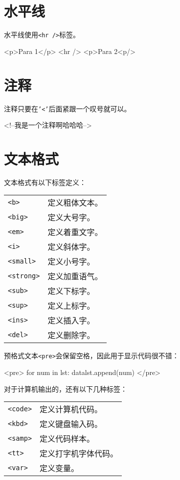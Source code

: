 \documentclass[a4paper,12pt]{report}
\newcommand{\httag}[1]{\texttt{<#1>\index{<#1>}}}
\begin{document}
\section{水平线}
水平线使用\httag{hr /}标签。
\begin{myht}
<p>Para 1</p>
<hr />
<p>Para 2<p/>
\end{myht}

\section{注释}
注释只要在\texttt{'<'}后面紧跟一个叹号就可以。
\begin{myht}
<!--我是一个注释啊哈哈哈-->
\end{myht}

\section{文本格式}
文本格式有以下标签定义：

\begin{center}
\begin{tabular}{ll}
\httag{b} &	定义粗体文本。\\
\httag{big} & 定义大号字。\\
\httag{em} & 定义着重文字。\\
\httag{i} &	定义斜体字。 \\
\httag{small} & 定义小号字。 \\
\httag{strong} & 定义加重语气。 \\
\httag{sub} & 定义下标字。 \\
\httag{sup} & 定义上标字。 \\
\httag{ins} & 定义插入字。 \\
\httag{del} & 定义删除字。
\end{tabular}
\end{center}

预格式文本\httag{pre}会保留空格，因此用于显示代码很不错：
\begin{myht}
<pre>
for num in lst:
    datalst.append(num)
</pre>
\end{myht}

对于计算机输出的，还有以下几种标签：
\begin{center}
\begin{tabular}{ll}
\httag{code} & 定义计算机代码。\\
\httag{kbd} & 定义键盘输入码。\\
\httag{samp} & 定义代码样本。\\
\httag{tt} & 定义打字机字体代码。 \\
\httag{var} & 定义变量。
\end{tabular}
\end{center}
\end{document}
